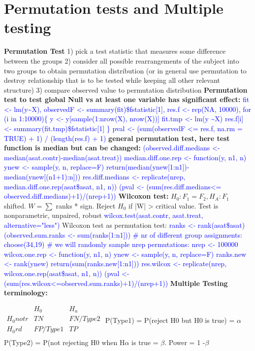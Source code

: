 \section{Permutation tests and Multiple testing}
\textbf{Permutation Test} 1) pick a test statistic that measures some difference between the groups 2) consider all possible rearrangements of the subject into two groups to obtain permutation distribution (or in general use permutation to destroy relationship that is to be tested while keeping all other relevant structure) 3) compare observed value to permutation distribution
\textbf{Permutation test to test global Null vs at least one variable has significant effect:}
\textcolor{blue}{fit <- lm(y\textasciitilde X),
observedF <- summary(fit)\$fstatistic[1],
res.f <- rep(NA, 10000),
for (i in 1:10000)\{
  y <- y[sample(1:nrow(X), nrow(X))]
  fit.tmp <- lm(y \textasciitilde X)
  res.f[i] <- summary(fit.tmp)\$fstatistic[1]
\}
pval <- (sum(observedF <= res.f, na.rm = TRUE) + 1) / (length(res.f) + 1)}
\textbf{general permutation test, here test function is median but can be changed: } \textcolor{blue}{(observed.diff.medians <- median(asat.contr)-median(asat.treat))
median.diff.one.rep <- function(y, n1, n){
  ynew <- sample(y, n, replace=F)
  return(median(ynew[1:n1])-median(ynew[(n1+1):n]))
}
res.diff.medians <- replicate(nrep, median.diff.one.rep(asat\$asat, n1, n))
(pval <- (sum(res.diff.medians<= observed.diff.medians)+1)/(nrep+1))}
\textbf{Wilcoxon test: } $H_0: F_1 = F_2, H_A: F_1$ shifted. $W = \sum$ ranks * sign. Reject $H_0$ if |W| > critical value.
Test is nonparametric, unpaired, robust \textcolor{blue}{wilcox.test(asat.contr, asat.treat, alternative="less")} Wilcoxon test as permutation test: \textcolor{blue}{ranks <- rank(asat\$asat)
(observed.sum.ranks <- sum(ranks[1:n1]))
\# nr of different group assignments:
choose(34,19)
\# we will randomly sample nrep permutations:
nrep <- 100000
wilcox.one.rep <- function(y, n1, n){
  ynew <- sample(y, n, replace=F)
  ranks.new <- rank(ynew)
  return(sum(ranks.new[1:n1]))
}
res.wilcox <- replicate(nrep, wilcox.one.rep(asat\$asat, n1, n))
(pval <- (sum(res.wilcox<=observed.sum.ranks)+1)/(nrep+1))}
\textbf{Multiple Testing terminology: }

$\begin{matrix}
& H_0 & H_a  \\
H_0 not r & TN & FN/Type2\\
H_0rd & FP/Type1 & TP \\
\end{matrix}$
P(Type1) = P(reject H0 but H0 is true) = $\alpha$
P(Type2) = P(not rejecting H0 when H$\alpha$ is true = $\beta$. Power = 1 -$\beta$

